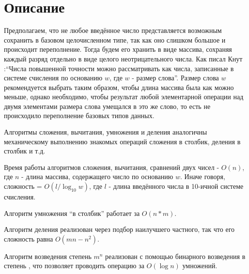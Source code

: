 \section{Описание}
Предполагаем, что не любое введённое число представляется возможным сохранить в базовом целочисленном типе, так как оно слишком большое и происходит переполнение. Тогда будем его хранить в виде массива, сохраняя каждый разряд отдельно в виде целого неотрицательного числа. Как писал Кнут \cite{Knut}:\enquote{Числа повышенной точности можно рассматривать как числа, записанные в системе счисления по основанию $w$, где $w$ - размер слова}. Размер слова $w$ рекомендуется выбрать таким образом, чтобы длина массива была как можно меньше, однако необходимо, чтобы результат любой элементарной операции над двумя элементами размера слова умещался в это же слово, то есть не происходило переполнение базовых типов данных. 

Алгоритмы сложения, вычитания, умножения и деления аналогичны механическому выполнению знакомых операций сложения в столбик, деления в столбик и т.д. 

Время работы алгоритмов сложения, вычитания, сравнений двух чисел - $O(n)$, где $n$ - длина массива, содержащего число по основанию $w$. Иначе говоря, сложность = $O(l/ \log_{10} w )$, где $l$ - длина введённого числа в 10-ичной системе счисления.

Алгоритм умножения \enquote{в столбик} работает за $O(n*m)$.

Алгоритм деления реализован через подбор наилучшего частного, так что его сложность равна $O(mn-n^2)$.

Алгоритм возведения степень $m^n$ реализован с помощью бинарного возведения в степень \cite{e-maxx}, что позволяет проводить операцию за $O(\log n)$ умножений.

\pagebreak

